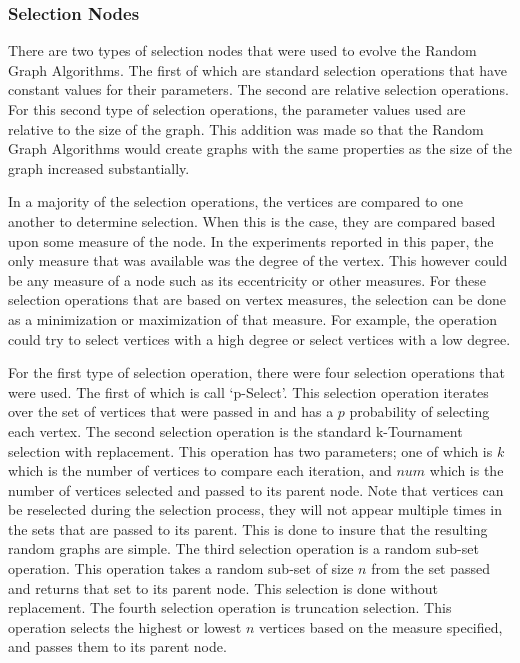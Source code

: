 \documentclass{article}
\begin{document}
\subsubsection{Selection Nodes}
There are two types of selection nodes that were used to evolve the Random Graph Algorithms. The first of which are standard
selection operations that have constant values for their parameters. The second are relative selection operations. For this 
second type of selection operations, the parameter values used are relative to the size of the graph. This addition was made
so that the Random Graph Algorithms would create graphs with the same properties as the size of the graph increased substantially. 

In a majority of the selection operations, the vertices are compared to one another to determine selection. When this is the case, 
they are compared based upon some measure of the node. In the experiments reported in this paper, the only measure that was available
was the degree of the vertex. This however could be any measure of a node such as its eccentricity or other measures. For these
selection operations that are based on vertex measures, the selection can be done as a minimization or maximization of that measure. For
example, the operation could try to select vertices with a high degree or select vertices with a low degree.

For the first type of selection operation, there were four selection operations that were used. The first of which is call `p-Select'.
This selection operation iterates over the set of vertices that were passed in and has a $p$ probability of selecting each vertex. The
second selection operation is the standard k-Tournament selection with replacement. This operation has two parameters; one of which is $k$ which
is the number of vertices to compare each iteration, and $num$ which is the number of vertices selected and passed to its parent node. Note that 
vertices can be reselected during the selection process, they will not appear multiple times in the sets that are passed to its parent. This 
is done to insure that the resulting random graphs are simple. The third selection operation is a random sub-set operation. This operation takes 
a random sub-set of size $n$ from the set passed and returns that set to its parent node. This selection is done without replacement. The fourth 
selection operation is truncation selection. This operation selects the highest or lowest $n$ vertices based on the measure specified, and passes
them to its parent node.
\end{document}
